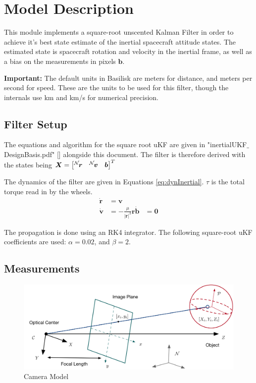 
\section{Model Description}

This module implements a square-root unscented Kalman Filter in order to achieve it's best state estimate of the inertial spacecraft attitude states. The estimated state is spacecraft rotation and velocity in the inertial frame, as well as a bias on the measurements in pixels $\bm b$. 

\textbf{Important:} The default units in Basilisk are meters for distance, and meters per second for speed. These are the units to be used for this filter, though the internals use km and km/s for numerical precision. 

\subsection{Filter Setup} %

The equations and algorithm for the square root uKF are given in "inertialUKF$\_$DesignBasis.pdf" [] alongside this document.
The filter is therefore derived with the states being $\bm X =\begin{bmatrix} \leftexp{N}{\bm r}&  \leftexp{N}{\bm v}  &  \bm b \end{bmatrix}^{T}$

The dynamics of the filter are given in Equations \eqref{eq:dynInertial}. $\tau$ is the total torque read in by the wheels. 
\begin{align}
\label{eq:dynInertial}
\dot{\bm r} &=\bm v \\
\dot{\bm v} & = - \frac{\mu}{|\bm r|^3} \bm r
\dot{\bm b} & = \bm 0
\end{align}

The propagation is done using an RK4 integrator. 
The following square-root uKF coefficients are used: $\alpha = 0.02$, and $\beta = 2$. 


\subsection{Measurements}

\begin{figure}[H]
	\centerline{
		\includegraphics{Figures/CameraGeometry}
	}
	\caption{Camera Model}
	\label{fig:camera}
\end{figure}


